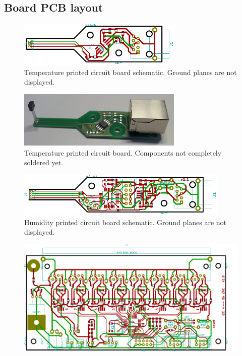 \documentclass[a4paper]{scrreprt}
\begin{document}
\begin{appendices}
\chapter{Board PCB layout}
\begin{figure}[Hh!]
	\centering
	\includegraphics[width=0.7\textwidth]{img/boards/temperature_kicad.pdf}
	\caption{Temperature printed circuit board schematic. Ground planes are not displayed.}
	\label{fig:pcb_temp}
\end{figure}
\begin{figure}[Hh!]
	\centering
	\includegraphics[width=0.7\textwidth]{img/boards/temperature_pcp.jpg}
	\caption{Temperature printed circuit board. Components not completely soldered yet.}
	\label{fig:soldered_temp}
\end{figure}
\begin{figure}[Hh!]
	\centering
	\includegraphics[width=0.9\textwidth]{img/boards/humidity_kicad.pdf}
	\caption{Humidity printed circuit board schematic. Ground planes are not displayed.}
	\label{fig:pcb_hum}
\end{figure}
\begin{figure}[Hh!]
	\centering
	\includegraphics[height=0.6\textwidth, angle=270]{img/boards/collector_kicad.pdf}

\end{figure}
\end{appendices}
\end{document}
